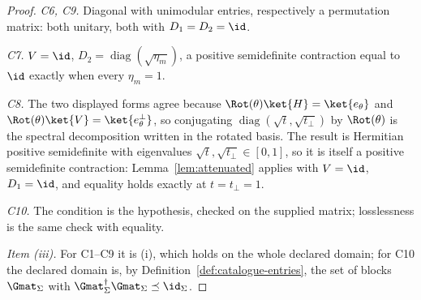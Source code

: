 \begin{proof}
\emph{C6, C9.} Diagonal with unimodular entries, respectively a permutation
matrix: both unitary, both with $D_1=D_2=\id$.

\emph{C7.} $V=\id$, $D_2=\operatorname{diag}(\sqrt{\eta_m})$, a positive
semidefinite contraction equal to $\id$ exactly when every $\eta_m=1$.

\emph{C8.} The two displayed forms agree because
$\Rot(\theta)\ket{H}=\ket{e_\theta}$ and $\Rot(\theta)\ket{V}=
\ket{e_\theta^{\perp}}$, so conjugating $\operatorname{diag}(\sqrt t,
\sqrt{t_\perp})$ by $\Rot(\theta)$ is the spectral decomposition written in
the rotated basis. The result is Hermitian positive semidefinite with
eigenvalues $\sqrt t,\sqrt{t_\perp}\in[0,1]$, so it is itself a positive
semidefinite contraction: Lemma~\ref{lem:attenuated} applies with
$V=\id$, $D_1=\id$, and equality holds exactly at $t=t_\perp=1$.

\emph{C10.} The condition is the hypothesis, checked on the supplied matrix;
losslessness is the same check with equality.

\emph{Item (iii).} For C1--C9 it is (i), which holds on the whole declared
domain; for C10 the declared domain is, by
Definition~\ref{def:catalogue-entries}, the set of blocks $\Gmat_\Sigma$ with
$\Gmat_\Sigma^\dagger\Gmat_\Sigma\preceq\id_\Sigma$.
\end{proof}
